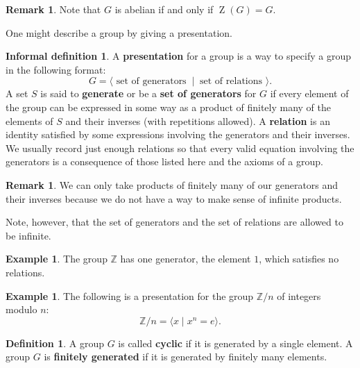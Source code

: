 \documentclass[12pt]{report}
\numberwithin{equation}{section}
\numberwithin{theorem}{chapter}
\theoremstyle{definition}
\newtheorem{definition}[theorem]{Definition}
\newtheorem{fuzzydefn}[theorem]{Informal definition}
\newtheorem{example}[theorem]{Example}
\newtheorem*{basic properties}{Basic Properties}
\newtheorem*{Important Remark}{Important Remark}
\newtheorem{remark}[theorem]{Remark}
\newcommand{\Z}{\mathbb{Z}}
\DeclareMathOperator{\Zc}{Z}
\begin{document}
\begin{remark}
	Note that $G$ is abelian if and only if $\Zc(G) = G$.
\end{remark}



One might describe a group by giving a presentation.


\begin{fuzzydefn}
A {\bf presentation} for a group is a way to specify a group in the following format:
$$G=\langle \text{ set of generators } \ | \ \text{ set of relations } \rangle.$$
A set $S$ is said to {\bf generate} or be a {\bf set of generators} for $G$ if every element of the group can be expressed in some way as a product of finitely many of the elements of $S$ and their inverses (with repetitions allowed). 
A {\bf relation} is an identity satisfied by some expressions involving the generators and their inverses. We usually record just enough relations so that every valid equation involving the generators is a consequence of those listed here and the axioms of a group.
\end{fuzzydefn}


\begin{remark}
	We can only take products of finitely many of our generators and their inverses because we do not have a way to make sense of infinite products.
\end{remark}

Note, however, that the set of generators and the set of relations are allowed to be infinite.

\begin{example}
	The group $\Z$ has one generator, the element $1$, which satisfies no relations.
\end{example}

\begin{example}
	The following is a presentation for the group $\mathbb{Z}/n$ of integers modulo $n$:
	$$\Z/n = \langle x \mid x^n = e \rangle.$$
\end{example}



\begin{definition}
	A group $G$ is called {\bf cyclic} if it is generated by a single element. A group $G$ is {\bf finitely generated} if it is generated by finitely many elements.
\end{definition}
\end{document}
